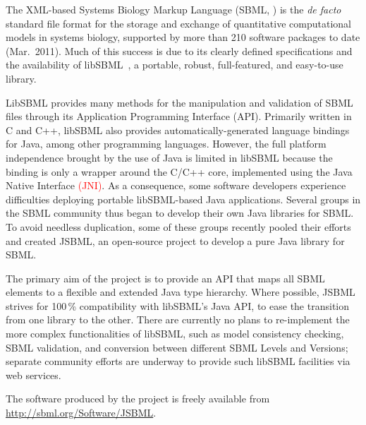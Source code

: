 \documentclass{bioinfo}
\begin{document}
The XML-based Systems Biology Markup Language (SBML, \citealt{M.Hucka03012003})
is the \emph{de facto} standard file format for the storage and exchange of
quantitative computational models in systems biology, supported by more than
210 software packages to date (Mar.~2011).
Much of this success is due to its
clearly defined specifications and the availability of libSBML~\citep{Bornstein2008},
a portable, robust, full-featured, and easy-to-use library.

LibSBML provides many methods for the manipulation and validation of
SBML files through its Application Programming Interface (API).
Primarily written in C and C++, libSBML also provides automatically-generated
language bindings for Java\texttrademark, among other programming languages.
However, the full platform independence brought by the use of Java is limited in
libSBML because the binding is only a wrapper
around the C/C++ core, implemented using the Java Native Interface \textcolor{red}{(JNI)}.
As a consequence, some software developers experience difficulties
deploying portable libSBML-based Java applications.
Several groups in the SBML community thus began to
develop their own Java libraries for SBML. To avoid needless duplication, some of
these groups recently pooled their efforts and created JSBML, an
open-source project to develop a pure Java library for SBML.

The primary aim of the project is to provide an API 
that maps all SBML elements to a flexible and extended
Java type hierarchy. Where possible, JSBML strives for
100\,\% compatibility with libSBML's Java API, to ease the transition from
one library to the other. There are currently no plans to re-implement 
the more complex functionalities of libSBML, such as model consistency checking,
SBML validation, and conversion between different SBML Levels and Versions;
separate community efforts are underway to provide such libSBML facilities
via web services.

The software produced by the project is freely available from
\href{http://sbml.org/Software/JSBML}{http://sbml.org/Software/JSBML}.


\end{document}
